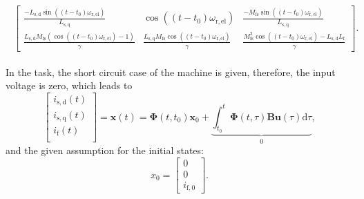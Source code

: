\begin{solutionblock}
\begin{align}
\begin{split}
\begin{bmatrix}
            \frac{-L_{\mathrm{s,d}}\sin((t-t_{\mathrm{0}})\omega_{\mathrm{r,el}})}{L_{\mathrm{s,q}}} & \cos((t-t_{\mathrm{0}})\omega_{\mathrm{r,el}}) & \frac{-M_{\mathrm{fs}}\sin((t-t_{\mathrm{0}})\omega_{\mathrm{r,el}})}{L_{\mathrm{s,q}}} \\
            \frac{L_{\mathrm{s,d}}M_{\mathrm{fs}}(\cos((t-t_{\mathrm{0}})\omega_{\mathrm{r,el}})-1)}{\gamma} & \frac{L_{\mathrm{s,q}}M_{\mathrm{fs}}\cos((t-t_{\mathrm{0}})\omega_{\mathrm{r,el}})}{\gamma} & \frac{M_{\mathrm{fs}}^2\cos((t-t_{\mathrm{0}})\omega_{\mathrm{r,el}})-L_{\mathrm{s,d}}L_{\mathrm{f}}}{\gamma}
        \end{bmatrix}.
        \end{split}
    \end{align}


    In the task, the short circuit case of the machine is given, therefore, the input voltage is zero, which leads to
    \begin{equation}
        \begin{bmatrix}
            i_{\mathrm{s,d}}(t) \\
            i_{\mathrm{s,q}}(t) \\
            i_{\mathrm{f}}(t) \\
        \end{bmatrix}
        = \bm{x}(t) = \bm{\Phi}(t,t_{\mathrm{0}})\bm{x}_{\mathrm{0}} + 
        \underbrace{
        \int_{t_{\mathrm{0}}}^{t}\bm{\Phi}(t,\tau)\bm{B}\bm{u}(\tau) \mathrm{d}\tau}_{0},
    \end{equation}
    and the given assumption for the initial states:
    \begin{equation}
        x_{\mathrm{0}} =
        \begin{bmatrix}
            0 \\
            0 \\
            i_{\mathrm{f,0}}
        \end{bmatrix}.
    \end{equation}


\end{solutionblock}
